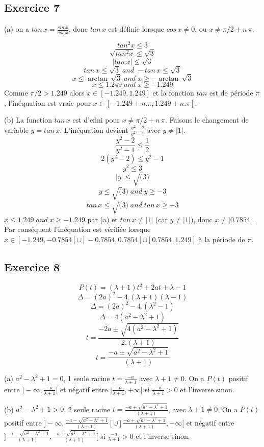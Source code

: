 \documentclass[]{book}
\theoremstyle{definition}
\begin{document}
\subsection*{Exercice 7}
(a) on a $tan\, x = \frac{sin\, x}{cos\, x}$, donc $tan\, x$ est d\'efinie lorsque $cos\, x \neq 0$, ou $x \neq \pi/2+n\,\pi$.

$$tan^2 x \leq 3$$
$$\sqrt{tan^2 x} \leq \sqrt{3}$$
$$|tan\, x| \leq \sqrt{3}$$
$$tan\, x \leq \sqrt{3} \; and \; -tan\, x \leq \sqrt{3}$$
$$x \leq \arctan\, \sqrt{3} \; and \; x \geq -\arctan\, \sqrt{3}$$
$$x \leq 1.249 \; and \; x \geq -1.249$$
Comme $\pi/2 > 1.249$ alors $x \in [-1.249, 1.249]$ et la fonction $tan$ est de p\'eriode $\pi$, l'in\'equation est vraie pour $x \in [-1.249+n.\pi, 1.249+n.\pi]$.



(b) La function $tan\, x$ est d'efini pour $x \neq \pi/2+n\,\pi$. Faisons le changement de variable $y=tan\, x$. L'in\'equation devient $\frac{y^2-2}{y^2-1}$ avec $y \neq |1|$.
$$\frac{y^2-2}{y^2-1} \leq \frac{1}{2}$$
$$2(y^2-2) \leq y^2-1$$
$$y^2 \leq 3$$
$$|y| \leq \sqrt(3)$$
$$y \leq \sqrt(3) \; and \; y \geq -3$$
$$tan\, x \leq \sqrt(3) \; and \; tan\, x \geq -3$$
$x \leq 1.249 \; and \; x \geq -1.249$ par (a) et $tan\, x \neq |1|$ (car $y \neq |1|$), donc $x \neq |0.7854|$. Par cons\'equent l'in\'equation est v\'erifi\'ee lorsque $x \in [-1.249,-0.7854[ \cup ]-0.7854,0.7854[ \cup ]0.7854,1.249]$ \`a la p\'eriode de $\pi$.
  
\subsection*{Exercice 8}
$$P(t) = (\lambda + 1)t^2 + 2at + \lambda -1$$
$$\Delta = (2a)^2 - 4.(\lambda + 1)(\lambda - 1)$$
$$\Delta = (2a)^2 - 4.(\lambda^2 - 1)$$
$$\Delta = 4(a^2 - \lambda^2 + 1)$$
$$t = \frac{-2a \pm \sqrt{4(a^2 - \lambda^2 + 1)}}{2.(\lambda + 1)}$$
$$t = \frac{-a \pm \sqrt{a^2 - \lambda^2 + 1}}{(\lambda + 1)}$$

(a) $a^2-\lambda^2+1=0$, 1 seule racine $t=\frac{-a}{\lambda+1}$ avec $\lambda+1 \neq 0$. On a $P(t)$ positif entre $]-\infty, \frac{-a}{\lambda+1}[$ et n\'egatif entre $]\frac{-a}{\lambda+1},+\infty]$ si $\frac{-a}{\lambda+1} > 0$ et l'inverse sinon.
  


(b) $a^2-\lambda^2+1>0$, 2 seule racine $t=\frac{-a \pm \sqrt{a^2 - \lambda^2 + 1}}{(\lambda + 1)}$, avec $\lambda+1 \neq 0$. On a $P(t)$ positif entre $]-\infty, \frac{-a - \sqrt{a^2 - \lambda^2 + 1}}{(\lambda + 1)}[ \cup ]\frac{-a + \sqrt{a^2 - \lambda^2 + 1}}{(\lambda + 1)}, +\infty[$ et n\'egatif entre $]\frac{-a - \sqrt{a^2 - \lambda^2 + 1}}{(\lambda + 1)},\frac{-a + \sqrt{a^2 - \lambda^2 + 1}}{(\lambda + 1)}[$ si $\frac{-a}{\lambda+1} > 0$ et l'inverse sinon.
\end{document}
